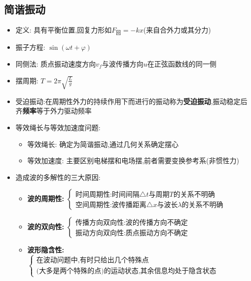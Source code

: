 \documentclass{article}
\begin{document}
\subsection{简谐振动}
\begin{itemize}
    \item 定义: 具有平衡位置,回复力形如$F_{\text{回}} = -kx$(来自合外力或其分力)
    \item 振子方程: $\sin{(\omega t + \varphi)}$
    \item 同侧法: 质点振动速度方向$v_{f}$与波传播方向$u$在正弦函数线的同一侧
    \item 摆周期: $T = 2\pi \sqrt{\frac{L}{g}}$
    \item 受迫振动:在周期性外力的持续作用下而进行的振动称为\textbf{受迫振动},振动稳定后齐\textbf{频率}等于外力驱动频率
    \item 等效绳长与等效加速度问题:
          \begin{itemize}
              \item 等效绳长: 确定为简谐振动,通过几何关系确定摆心
              \item 等效加速度: 主要区别电梯摆和电场摆,前者需要变换参考系(非惯性力)
          \end{itemize}
    \item  造成波的多解性的三大原因:
          \begin{itemize}
              \item \textbf{波的周期性:}\hspace{1em}
                    $\begin{cases}
                            \text{时间周期性:时间间隔}\triangle t \text{与周期} T \text{的关系不明确} \\
                            \text{空间周期性:波传播距离}\triangle x \text{与波长} \lambda \text{的关系不明确}
                        \end{cases}$

              \item \textbf{波的双向性:}\hspace{1em}
                    $\begin{cases}
                            \text{传播方向双向性:波的传播方向不确定} \\
                            \text{振动方向双向性:质点振动方向不确定}
                        \end{cases}$

              \item \textbf{波形隐含性:}\hspace{1em}
                    $\begin{cases}
                            \text{在波动问题中,有时只给出几个特殊点} \\
                            \text{(大多是两个特殊的点)的运动状态,其余信息均处于隐含状态}
                        \end{cases}$
          \end{itemize}
\end{itemize}
\end{document}
